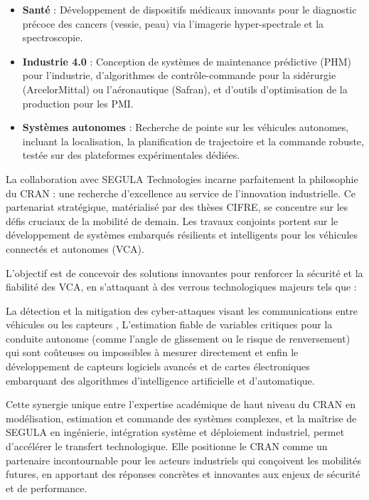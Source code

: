 \documentclass[12pt, a4paper]{report}
\begin{document}
\begin{itemize}
    \item \textbf{Santé} : Développement de dispositifs médicaux innovants pour le diagnostic précoce des cancers (vessie, peau) via l'imagerie hyper-spectrale et la spectroscopie.
    \item \textbf{Industrie 4.0} : Conception de systèmes de maintenance prédictive (PHM) pour l'industrie, d'algorithmes de contrôle-commande pour la sidérurgie (ArcelorMittal) ou l'aéronautique (Safran), et d'outils d'optimisation de la production pour les PMI.
    \item \textbf{Systèmes autonomes} : Recherche de pointe sur les véhicules autonomes, incluant la localisation, la planification de trajectoire et la commande robuste, testée sur des plateformes expérimentales dédiées.
\end{itemize}

La collaboration avec SEGULA Technologies incarne parfaitement la philosophie du CRAN : une recherche d'excellence au service de l'innovation industrielle. Ce partenariat stratégique, matérialisé par des thèses CIFRE, se concentre sur les défis cruciaux de la mobilité de demain. Les travaux conjoints portent sur le développement de systèmes embarqués résilients et intelligents pour les véhicules connectés et autonomes (VCA).

L'objectif est de concevoir des solutions innovantes pour renforcer la sécurité et la fiabilité des VCA, en s'attaquant à des verrous technologiques majeurs tels que :


 La détection et la mitigation des cyber-attaques visant les communications entre véhicules ou les capteurs , L'estimation fiable de variables critiques pour la conduite autonome (comme l'angle de glissement ou le risque de renversement) qui sont coûteuses ou impossibles à mesurer directement et enfin  le  développement de capteurs logiciels avancés et de cartes électroniques embarquant des algorithmes d'intelligence artificielle et d'automatique.


Cette synergie unique entre l'expertise académique de haut niveau du CRAN en modélisation, estimation et commande des systèmes complexes, et la maîtrise de SEGULA en ingénierie, intégration système et déploiement industriel, permet d'accélérer le transfert technologique. Elle positionne le CRAN comme un partenaire incontournable pour les acteurs industriels qui conçoivent les mobilités futures, en apportant des réponses concrètes et innovantes aux enjeux de sécurité et de performance.
\end{document}
